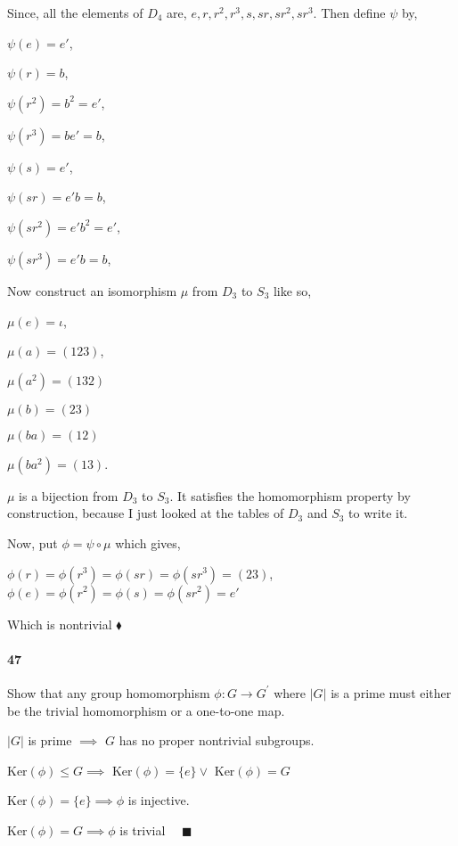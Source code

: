 \documentclass{article}
\begin{document}
Since, all the elements of $D_4$ are, $e, r,r^2,r^3,
s,sr,sr^2,sr^3$. Then define $\psi$ by,

$\psi(e) = e'$,

$\psi(r) = b$,

$\psi(r^2) = b^2 = e'$,

$\psi(r^3) = be' = b$,

$\psi(s) = e'$,

$\psi(sr) = e'b = b$,

$\psi(sr^2) = e'b^2 = e'$,

$\psi(sr^3) = e'b = b$,

Now construct an isomorphism $\mu$ from $D_3$ to $S_3$ like so,

$\mu(e)  = \iota$,

$\mu(a)  = (1 2 3)$,

$\mu(a^2)  = (1 3 2)$

$\mu(b)  = (2 3)$

$\mu(ba)  = (1 2)$

$\mu(ba^2)  = (1 3)$.

$\mu$ is a bijection from $D_3$ to $S_3$. It satisfies the
homomorphism property by construction, because I just looked at the
tables of $D_3$ and $S_3$ to write it.

Now, put $\phi = \psi\circ\mu$
which gives,

$\phi(r) = \phi(r^3) = \phi(sr) = \phi(sr^3) = (2 3)$,
$\phi(e) = \phi(r^2) = \phi(s) = \phi(sr^2) =e'$

Which is nontrivial $\blacklozenge$

\newpage
\paragraph{47} Show that any group homomorphism $\phi: G\rightarrow
G^\prime$ where $|G|$ is a prime must either be the trivial
homomorphism or a one-to-one map.


$|G|$ is prime $\implies$ $G$ has no proper nontrivial subgroups.

Ker$(\phi) \leq G \implies$ Ker$(\phi) = \{e\}\lor$ Ker$(\phi) = G$

Ker$(\phi) = \{e\} \implies \phi$ is injective.

Ker$(\phi) = G \implies \phi$ is trivial $\quad \blacksquare$
\end{document}
